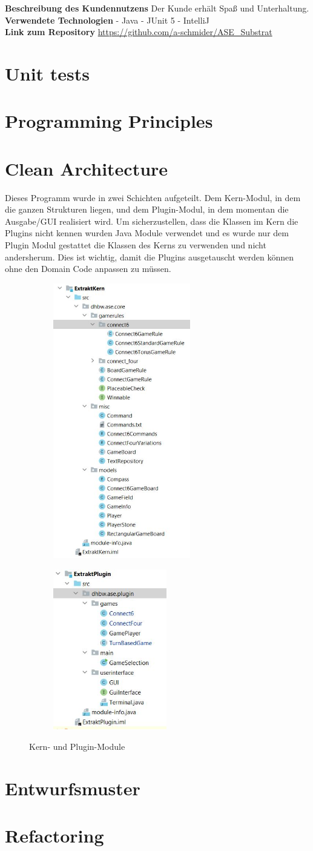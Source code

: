 \documentclass[12pt]{article}
\newcommand{\KernPackages}{\includegraphics[height=12cm]{Bilder/KernModul_Packages}}
\newcommand{\PluginPackages}{\includegraphics[height=7cm]{Bilder/PluginModul_Packages}}
\begin{document}
\noindent  \textbf{Beschreibung des Kundennutzens}
Der Kunde erhält Spaß und Unterhaltung.
\\

\noindent \textbf{Verwendete Technologien}
- Java
- JUnit 5
- IntelliJ
\\

\noindent \textbf{Link zum Repository}
\url{https://github.com/a-schmider/ASE_Substrat}

\newpage
\section{Unit tests}

\newpage
\section{Programming Principles}

\newpage
\section{Clean Architecture}
Dieses Programm wurde in zwei Schichten aufgeteilt. Dem Kern-Modul, in dem die ganzen Strukturen liegen, und dem Plugin-Modul, in dem momentan die Ausgabe/GUI realisiert wird. Um sicherzustellen, dass die Klassen im Kern die Plugins nicht kennen wurden Java Module verwendet und es wurde nur dem Plugin Modul gestattet die Klassen des Kerns zu verwenden und nicht andersherum. Dies ist wichtig, damit die Plugins ausgetauscht werden können ohne den Domain Code anpassen zu müssen.
\\

\begin{figure}[htpb!]
\centering
\begin{subfigure}{.5\textwidth}
  \centering
  {\KernPackages}\\[2cm]
  \label{fig:sub1}
\end{subfigure}%
\begin{subfigure}{.5\textwidth}
  \centering
  {\PluginPackages}\\[2cm]
  \label{fig:sub2}
\end{subfigure}
\caption{Kern- und Plugin-Module}
\label{fig:test}
\end{figure}





\newpage
\section{Entwurfsmuster}

\newpage
\section{Refactoring}
\end{document}
